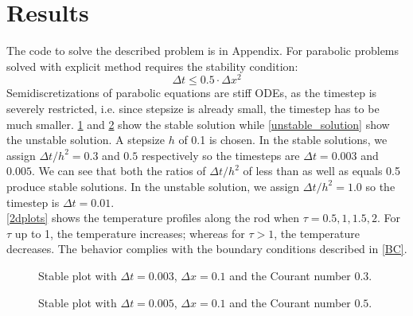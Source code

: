 \documentclass{article}
\begin{document}
\section{Results}

The code to solve the described problem is in Appendix. For parabolic problems solved with explicit method requires the stability condition:
\begin{equation}
    \Delta t \leq 0.5 \cdot \Delta x^2
\end{equation}
Semidiscretizations of parabolic equations are stiff ODEs, as the timestep is severely restricted, i.e. since stepsize is already small, the timestep has to be much smaller. \cref{stable_solution_0} and \cref{stable_solution} show the stable solution while \cref{unstable_solution} show the unstable solution. A stepsize $h$ of 0.1 is chosen. In the stable solutions, we assign $\Delta t / h^2 = 0.3$ and $0.5$ respectively so the timesteps are $\Delta t =  0.003$ and $0.005$. We can see that both the ratios of $\Delta t / h^2$ of less than as well as equals 0.5 produce stable solutions. In the unstable solution, we assign $\Delta t / h^2 = 1.0$ so the timestep is $\Delta t =  0.01$.  \\ 

\noindent
\cref{2dplots} shows the temperature profiles along the rod when $\tau = 0.5, 1, 1.5, 2$. For $\tau$ up to 1, the temperature increases; whereas for $\tau > 1$, the temperature decreases. The behavior complies with the boundary conditions described in \cref{BC}.

\begin{figure}
  \centering
  \caption{Stable plot with $\Delta t = 0.003$, $\Delta x = 0.1$ and the
    Courant number $0.3$.}
    \label{stable_solution_0}
\end{figure}

\begin{figure}
  \centering
  \caption{Stable plot with $\Delta t = 0.005$, $\Delta x = 0.1$ and the
    Courant number $0.5$.}
    \label{stable_solution}
\end{figure}
\end{document}
